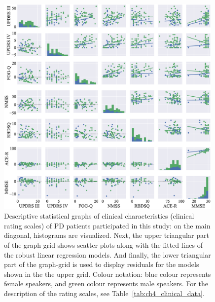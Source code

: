 \begin{figure}[htb!]
	\centering
	\scriptsize
	\includegraphics[width=0.99\textwidth]{pictures/ch4_clinical_statistics.eps}
	\caption[Descriptive statistical graphs of clinical data for PD patients.]{Descriptive statistical graphs of clinical characteristics (clinical rating scales) of PD patients participated in this study: on the main diagonal, histograms are visualized. Next, the upper triangular part of the graph-grid shows scatter plots along with the fitted lines of the robust linear regression models. And finally, the lower triangular part of the graph-grid is used to display residuals for the models shown in the the upper grid. Colour notation: blue colour represents female speakers, and green colour represents male speakers. For the description of the rating scales, see Table~\ref{tab:ch4_clinical_data}.}
	\label{fig:ch4_clinical_statistics}
\end{figure}

